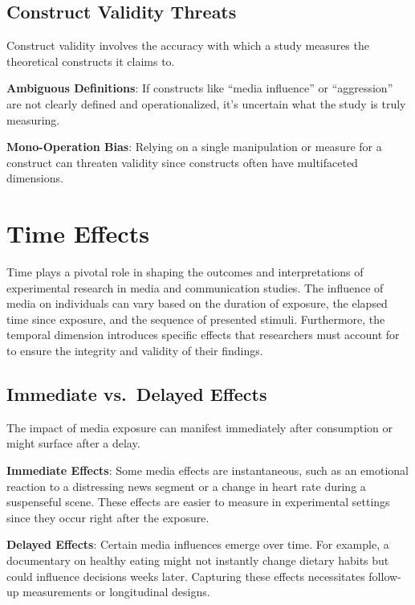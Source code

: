 \documentclass[
  b5paper]{book}
\begin{document}
\hypertarget{construct-validity-threats}{%
\subsection*{Construct Validity Threats}\label{construct-validity-threats}}

Construct validity involves the accuracy with which a study measures the theoretical constructs it claims to.

\textbf{Ambiguous Definitions}: If constructs like ``media influence'' or ``aggression'' are not clearly defined and operationalized, it's uncertain what the study is truly measuring.

\textbf{Mono-Operation Bias}: Relying on a single manipulation or measure for a construct can threaten validity since constructs often have multifaceted dimensions.

\hypertarget{time-effects}{%
\section{Time Effects}\label{time-effects}}

Time plays a pivotal role in shaping the outcomes and interpretations of experimental research in media and communication studies. The influence of media on individuals can vary based on the duration of exposure, the elapsed time since exposure, and the sequence of presented stimuli. Furthermore, the temporal dimension introduces specific effects that researchers must account for to ensure the integrity and validity of their findings.

\hypertarget{immediate-vs.-delayed-effects}{%
\subsection*{Immediate vs.~Delayed Effects}\label{immediate-vs.-delayed-effects}}

The impact of media exposure can manifest immediately after consumption or might surface after a delay.

\textbf{Immediate Effects}: Some media effects are instantaneous, such as an emotional reaction to a distressing news segment or a change in heart rate during a suspenseful scene. These effects are easier to measure in experimental settings since they occur right after the exposure.

\textbf{Delayed Effects}: Certain media influences emerge over time. For example, a documentary on healthy eating might not instantly change dietary habits but could influence decisions weeks later. Capturing these effects necessitates follow-up measurements or longitudinal designs.
\end{document}
